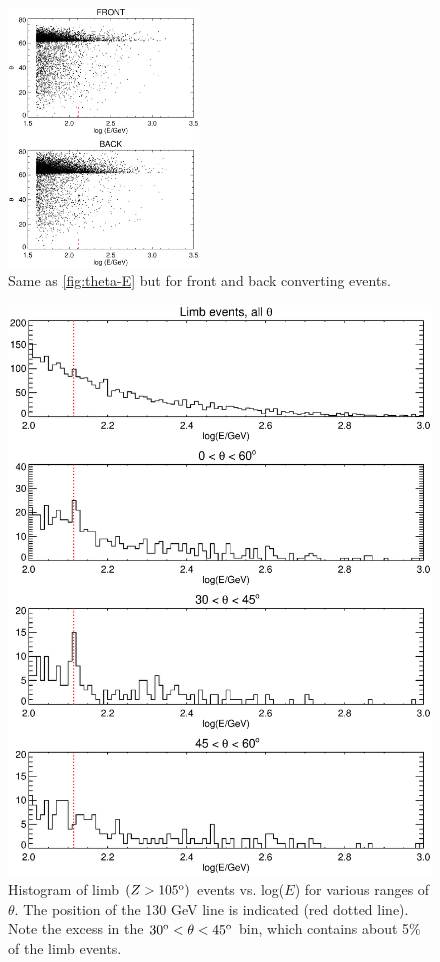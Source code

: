 \documentclass[aps,twocolumn,prd,superscriptaddress,showpacs,nofootinbib,fixfloat]{revtex4}
\newcommand{\degree}{^{\rm o}}
\begin{document}
\begin{figure}
  \centering
  \includegraphics[width=0.45\textwidth]{plots/theta-E-frontback.ps}
  \caption{Same as \ref{fig:theta-E} but for front and back
  converting events.}
  \label{fig:theta-E-frontback}
\end{figure}


\begin{figure}
  \centering
  \includegraphics[width=1.0\linewidth]{plots/Ehist-all.ps}
  \caption{Histogram of limb $(Z>105\degree)$ events vs.
  log($E$) for various ranges of $\theta$. The position of
  the 130 GeV line is indicated (red dotted line).  Note the
  excess in the $30\degree < \theta < 45\degree$ bin, which
  contains about 5\% of the limb events.}
  \label{fig:Ehist-all}
\end{figure}
\end{document}
